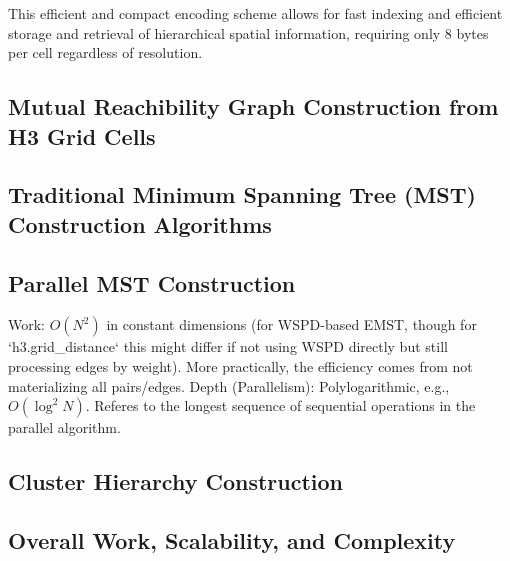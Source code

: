 This efficient and compact encoding scheme allows for fast indexing and efficient storage and retrieval of hierarchical spatial information, requiring only 8 bytes per cell regardless of resolution.

\lipsum[1]
\subsection{Mutual Reachibility Graph Construction from H3 Grid Cells}
\lipsum[1-3]

\subsection{Traditional Minimum Spanning Tree (MST) Construction Algorithms}

\subsection{Parallel MST Construction}
 Work: $O(N^2)$ in constant dimensions (for WSPD-based EMST, though for `h3.grid_distance` this might differ if not using WSPD directly but still processing edges by weight). More practically, the efficiency comes from not materializing all pairs/edges.
Depth (Parallelism): Polylogarithmic, e.g., $O(\log^2 N)$. Referes to the longest sequence of sequential operations in the parallel algorithm. 

\subsection{Cluster Hierarchy Construction}


\subsection{Overall Work, Scalability, and Complexity}

